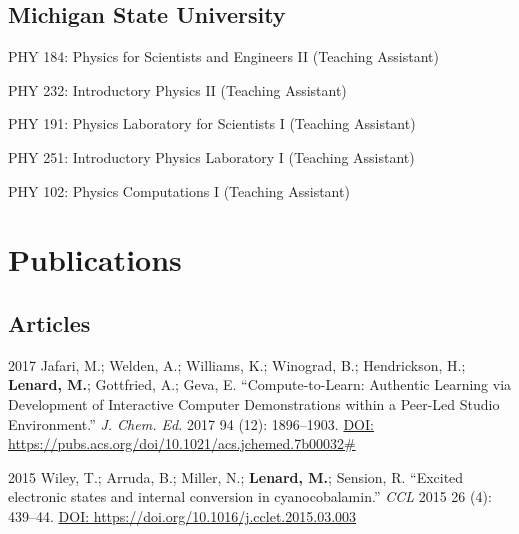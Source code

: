 \documentclass[12pt,letterpaper]{report}
\newcommand{\listitemspace}{0.25em}
\renewenvironment{itemize}
{\begin{list}{}{\setlength{\leftmargin}{0em}
            \setlength{\parskip}{0em}
            \setlength{\itemsep}{\listitemspace}
            \setlength{\parsep}{\listitemspace}}}
{\end{list}}
\begin{document}
\subsection*{Michigan State University}

\begin{itemize}

        \item PHY 184: Physics for Scientists and Engineers II (Teaching Assistant)
        
        \item PHY 232: Introductory Physics II (Teaching Assistant)
        
        \item PHY 191: Physics Laboratory for Scientists I (Teaching Assistant)
        
        \item PHY 251: Introductory Physics Laboratory I (Teaching Assistant)
        
        \item PHY 102: Physics Computations I (Teaching Assistant)

\end{itemize}



\section*{Publications}

\subsection*{Articles}

\begin{tablist}
   
        \item[2017] \tab Jafari, M.; Welden, A.; Williams, K.; Winograd, B.; Hendrickson, H.; \textbf{Lenard, M.}; Gottfried, A.; Geva, E. \enquote{Compute-to-Learn: Authentic Learning via Development of Interactive Computer Demonstrations within a Peer-Led Studio Environment.} \textit{J. Chem. Ed.} 2017 94 (12): 1896--1903. \href{https://pubs.acs.org/doi/10.1021/acs.jchemed.7b00032\#}{DOI: https://pubs.acs.org/doi/10.1021/acs.jchemed.7b00032\#}

        \item[2015] \tab Wiley, T.; Arruda, B.; Miller, N.; \textbf{Lenard, M.}; Sension, R. \enquote{Excited electronic states and internal conversion in cyanocobalamin.} \textit{CCL} 2015 26 (4): 439--44. \href{https://doi.org/10.1016/j.cclet.2015.03.003}{DOI: https://doi.org/10.1016/j.cclet.2015.03.003}

\end{tablist}
\end{document}
